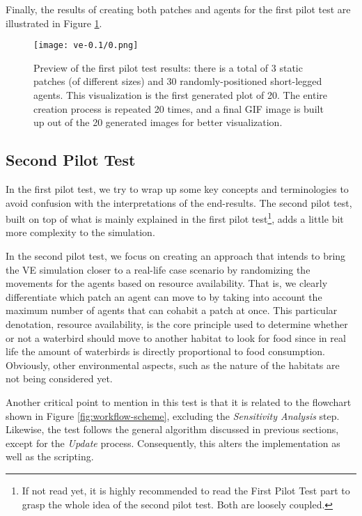 Finally, the results of creating both patches and agents for the first pilot test are illustrated in Figure \ref{fig:pilot-test-1}.

\begin{figure}[h!]
    \centering
    \texttt{[image: ve-0.1/0.png]}
    \caption{Preview of the first pilot test results: there is a total of 3 static patches (of different sizes) and 30 randomly-positioned short-legged agents. This visualization is the first generated plot of 20. The entire creation process is repeated 20 times, and a final GIF image is built up out of the 20 generated images for better visualization.}
    \label{fig:pilot-test-1}
\end{figure}

\subsection{Second Pilot Test}
In the first pilot test, we try to wrap up some key concepts and terminologies to avoid confusion with the interpretations of the end-results. The second pilot test, built on top of what is mainly explained in the first pilot test\footnote{If not read yet, it is highly recommended to read the First Pilot Test part to grasp the whole idea of the second pilot test. Both are loosely coupled.}, adds a little bit more complexity to the simulation.

In the second pilot test, we focus on creating an approach that intends to bring the VE simulation closer to a real-life case scenario by randomizing the movements for the agents based on resource availability. That is, we clearly differentiate which patch an agent can move to by taking into account the maximum number of agents that can cohabit a patch at once. This particular denotation, resource availability, is the core principle used to determine whether or not a waterbird should move to another habitat to look for food since in real life the amount of waterbirds is directly proportional to food consumption. Obviously, other environmental aspects, such as the nature of the habitats are not being considered yet.

Another critical point to mention in this test is that it is related to the flowchart shown in Figure \ref{fig:workflow-scheme}, excluding the \emph{Sensitivity Analysis} step. Likewise, the test follows the general algorithm discussed in previous sections, except for the \emph{Update} process. Consequently, this alters the implementation as well as the scripting.


